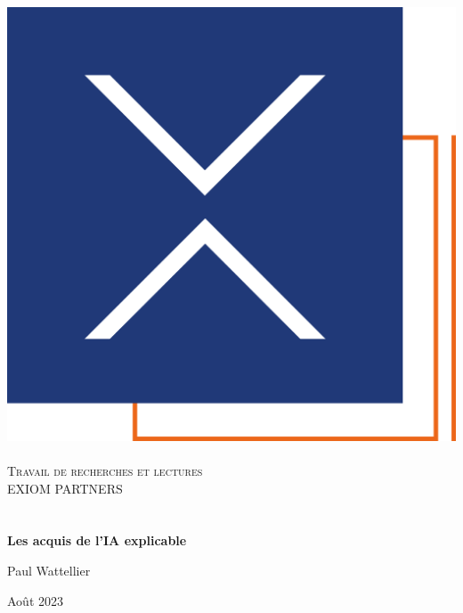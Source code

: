 
\begin{titlepage}
  \begin{sffamily}
  \begin{center}

    \includegraphics[scale=0.3]{Images/logo_exiom.png}~\\[1.5cm]


    \textsc{\Large Travail de recherches et lectures}\\[1.5cm]
    
    \textsc{EXIOM PARTNERS}\\[1cm]

    \HRule \\[0.4cm]
    
    {\huge \bfseries \\[0.4cm] Les acquis de l'IA explicable}
    \HRule \\[2cm]
    

    \begin{minipage}{0.4\textwidth}
      \begin{flushleft} \large
         Paul Wattellier
      \end{flushleft}
    \end{minipage}
    \begin{minipage}{0.4\textwidth}
      \begin{flushright} \large
      \end{flushright}
    \end{minipage}

    \vfill

    {\large  Août 2023}

  \end{center}
  \end{sffamily}
\end{titlepage}
